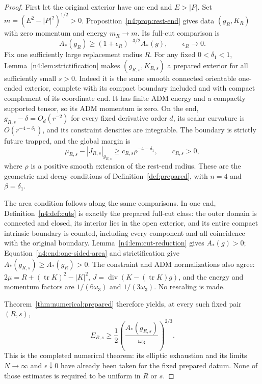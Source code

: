 \begin{proof}
First let the original exterior have one end and $E>|P|$.
Set $m=(E^2-|P|^2)^{1/2}>0$.
Proposition~\ref{n4:prop:rest-end} gives data $(g_R,K_R)$ with
zero momentum and energy $m_R\to m$. Its full-cut comparison is
\begin{equation}\label{n4:end:one-sided-area}
 A_*(g_R)\ge(1+\epsilon_R)^{-3/2}A_*(g),
 \qquad \epsilon_R\longrightarrow0.
\end{equation}
Fix one sufficiently large replacement radius $R$. For any fixed
$0<\delta_1<1$, Lemma~\ref{n4:lem:strictification} makes
$(g_{R,s},K_{R,s})$ a prepared exterior for all sufficiently small
$s>0$. Indeed it is the same smooth connected orientable one-ended
exterior, complete with its compact boundary included and with compact
complement of its coordinate end. It has finite ADM energy and a
compactly supported tensor, so its ADM momentum is zero. On the end,
$g_{R,s}-\delta=O_d(r^{-2})$ for every fixed derivative order $d$,
its scalar curvature is
$O(r^{-4-\delta_1})$, and its constraint densities are integrable.
The boundary is strictly future trapped, and the global margin is
\[
 \mu_{R,s}-|J_{R,s}|_{g_{R,s}}
 \ge c_{R,s}\rho^{-4-\delta_1},\qquad c_{R,s}>0,
\]
where $\rho$ is a positive smooth extension of the rest-end radius.
These are the geometric and decay conditions of
Definition~\ref{def:prepared}, with $n=4$ and $\beta=\delta_1$.

The area condition follows along the same comparisons. In one end,
Definition~\ref{n4:def:cuts} is exactly the prepared full-cut class:
the outer domain is connected and closed, its interior lies in the
open exterior, and its entire compact intrinsic boundary is counted,
including every component and all coincidence with the original boundary.
Lemma~\ref{n4:lem:cut-reduction} gives $A_*(g)>0$;
Equation~\eqref{n4:end:one-sided-area} and strictification give
$A_*(g_{R,s})\ge A_*(g_R)>0$.
The constraint and ADM normalizations also agree:
$2\mu=R+(\operatorname{tr}K)^2-|K|^2$,
$J=\operatorname{div}(K-(\operatorname{tr}K)g)$, and the energy and
momentum factors are $1/(6\omega_3)$ and $1/(3\omega_3)$.
No rescaling is made.

Theorem~\ref{thm:numerical:prepared} therefore yields, at every such
fixed pair $(R,s)$,
\begin{equation}\label{n4:end:fixed-prepared-inequality}
 E_{R,s}\ge\frac12
       \left(\frac{A_*(g_{R,s})}{\omega_3}\right)^{2/3}.
\end{equation}
This is the completed numerical theorem: its elliptic exhaustion and
its limits $N\to\infty$ and $\epsilon\downarrow0$ have already been
taken for the fixed prepared datum. None of those estimates is required
to be uniform in $R$ or $s$.


\end{proof}
